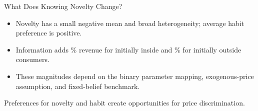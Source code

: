 \documentclass[aspectratio=169,professionalfonts]{beamer}
\newcommand{\shortbuttons}{}
\begin{document}
\gdef\shortbuttons{}
\begin{frame}[label=short-50]{What Does Knowing Novelty Change?}
  \begin{itemize}
    \item Novelty has a small negative mean and broad heterogeneity; average habit preference is positive.
    \item Information adds \correctedInsideRevenueChange\% revenue for initially inside and \correctedOutsideRevenueChange\% for initially outside consumers.
    \item These magnitudes depend on the binary parameter mapping, exogenous-price assumption, and fixed-belief benchmark.
  \end{itemize}
  \begin{tcolorbox}
    Preferences for novelty and habit create opportunities for price discrimination.
  \end{tcolorbox}
\end{frame}





\appendix

\end{document}
